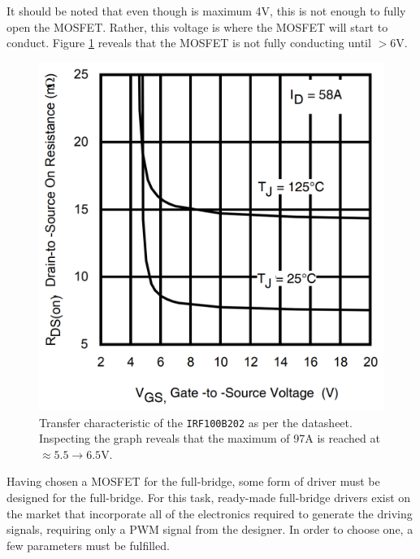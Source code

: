 It should be noted that even though \vth is maximum 4V, this is not enough to fully open the MOSFET.
Rather, this voltage is where the MOSFET will start to conduct.
Figure \ref{fig:mosfettransfercharacteristic} reveals that the MOSFET is not fully conducting until \vgs $>6$V.

\begin{figure}[H]
	\centering
	\includegraphics[width=0.6\linewidth]{graphics/mosfet_transfer_characteristic}
	\caption[Transfer characteristic of the IRF100B202.]{Transfer characteristic of the \texttt{IRF100B202} as per the datasheet.
	Inspecting the graph reveals that the maximum \id of 97A is reached at \vgs$\approx5.5\rightarrow6.5$V.}
	\label{fig:mosfettransfercharacteristic}
\end{figure}
 
Having chosen a MOSFET for the full-bridge, some form of driver must be designed for the full-bridge.
For this task, ready-made full-bridge drivers exist on the market that incorporate all of the electronics required to generate the driving signals, requiring only a PWM signal from the designer.
In order to choose one, a few parameters must be fulfilled.

